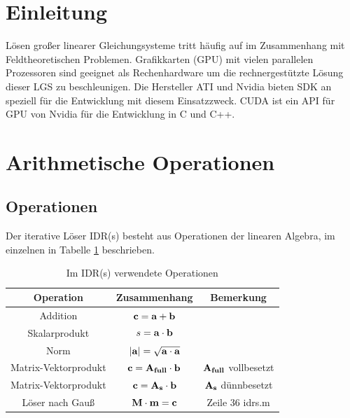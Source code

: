 \documentclass[journal]{IEEEtran}
\begin{document}
\section{Einleitung}
%
%
%
%
 Lösen großer linearer Gleichungsysteme tritt häufig auf im Zusammenhang
mit Feldtheoretischen Problemen.
Grafikkarten (GPU) mit vielen parallelen Prozessoren
sind geeignet als Rechenhardware um die rechnergestützte Lösung dieser LGS zu beschleunigen.
Die Hersteller ATI und Nvidia bieten SDK an speziell für die Entwicklung mit
diesem Einsatzzweck. CUDA \cite{cudapg} ist ein API für GPU von Nvidia für die Entwicklung in C und C++.


\section{Arithmetische Operationen}


\subsection{Operationen}

Der iterative Löser IDR(s) \cite{idrs} besteht aus Operationen \cite{idrs}
der linearen Algebra, im einzelnen in Tabelle \ref{idrsops} beschrieben.


\begin{table}[h]
\renewcommand{\arraystretch}{1.3}
\caption{Im IDR(s) verwendete Operationen}
\label{idrsops}
\centering
\begin{tabular}{|c||c||c|}
\hline
\bfseries Operation & \bfseries Zusammenhang & \bfseries Bemerkung \\
\hline\hline


  Addition & $ \bf{c} = \bf{a} + \bf{b}$ & \\
  \hline
  Skalarprodukt & $ s = \bf{a} \cdot \bf{b}$ & \\
  \hline
  Norm & $ |\bf{a}|= \sqrt{ \bf{a} \cdot \bf{a}}$ & \\
  \hline
  Matrix-Vektorprodukt & $ \bf{c}= \bf{A}_{full} \cdot {b} $ & $\bf{A_{full}}$ vollbesetzt\\
  \hline

  Matrix-Vektorprodukt & $   \bf{c} = \bf{A}_{s} \cdot \bf{b} $ & $\bf{A_{s}}$  dünnbesetzt \\
  \hline

  Löser nach Gauß & $  \bf{M} \cdot \bf{m} = \bf{c} $ &Zeile 36 idrs.m \cite{idrs} \\

\hline
\end{tabular}
\end{table}
\end{document}
